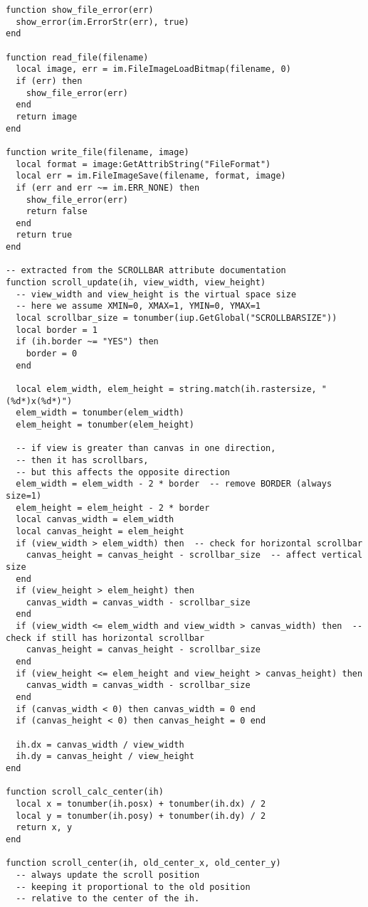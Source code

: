 \documentclass{ctexart}
\begin{document}
\begin{lstlisting}
function show_file_error(err)
  show_error(im.ErrorStr(err), true)
end

function read_file(filename)
  local image, err = im.FileImageLoadBitmap(filename, 0)
  if (err) then
    show_file_error(err)
  end
  return image
end

function write_file(filename, image)
  local format = image:GetAttribString("FileFormat")
  local err = im.FileImageSave(filename, format, image)
  if (err and err ~= im.ERR_NONE) then
    show_file_error(err)
    return false
  end
  return true
end

-- extracted from the SCROLLBAR attribute documentation 
function scroll_update(ih, view_width, view_height)
  -- view_width and view_height is the virtual space size 
  -- here we assume XMIN=0, XMAX=1, YMIN=0, YMAX=1 
  local scrollbar_size = tonumber(iup.GetGlobal("SCROLLBARSIZE"))
  local border = 1
  if (ih.border ~= "YES") then 
    border = 0
  end

  local elem_width, elem_height = string.match(ih.rastersize, "(%d*)x(%d*)")
  elem_width = tonumber(elem_width)
  elem_height = tonumber(elem_height)

  -- if view is greater than canvas in one direction,
  -- then it has scrollbars,
  -- but this affects the opposite direction 
  elem_width = elem_width - 2 * border  -- remove BORDER (always size=1) 
  elem_height = elem_height - 2 * border
  local canvas_width = elem_width
  local canvas_height = elem_height
  if (view_width > elem_width) then  -- check for horizontal scrollbar 
    canvas_height = canvas_height - scrollbar_size  -- affect vertical size 
  end
  if (view_height > elem_height) then 
    canvas_width = canvas_width - scrollbar_size
  end
  if (view_width <= elem_width and view_width > canvas_width) then  -- check if still has horizontal scrollbar 
    canvas_height = canvas_height - scrollbar_size
  end
  if (view_height <= elem_height and view_height > canvas_height) then
    canvas_width = canvas_width - scrollbar_size
  end
  if (canvas_width < 0) then canvas_width = 0 end
  if (canvas_height < 0) then canvas_height = 0 end

  ih.dx = canvas_width / view_width
  ih.dy = canvas_height / view_height
end

function scroll_calc_center(ih)
  local x = tonumber(ih.posx) + tonumber(ih.dx) / 2
  local y = tonumber(ih.posy) + tonumber(ih.dy) / 2
  return x, y
end

function scroll_center(ih, old_center_x, old_center_y)
  -- always update the scroll position
  -- keeping it proportional to the old position
  -- relative to the center of the ih. 


\end{lstlisting}
\end{document}
